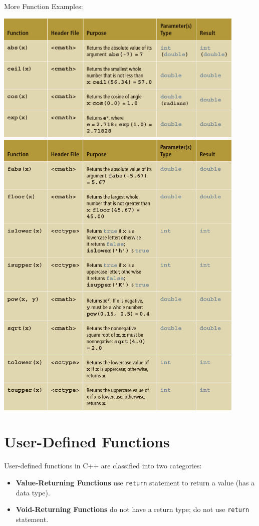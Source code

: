 \documentclass{article}
\begin{document}
\vspace{8pt}
More Function Examples:
\begin{center}
    \includegraphics[width=0.9\textwidth]{pre-def-func-1.png}
    \includegraphics[width=0.9\textwidth]{pre-def-func-2.png}
\end{center}

\section{User-Defined Functions}
User-defined functions in C++ are classified into two categories:
\begin{itemize}
  \item \textbf{Value-Returning Functions} use \texttt{return} statement to
    return a value (has a data type).
  \item \textbf{Void-Returning Functions} do not have a return type; do not use
    \texttt{return} statement.
\end{itemize}
\end{document}
